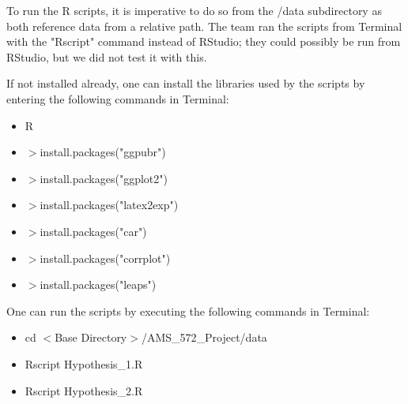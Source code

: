 To run the R scripts, it is imperative to do so from the /data subdirectory as both reference data from a relative path. The team ran the scripts from Terminal with the "Rscript" command instead of RStudio; they could possibly be run from RStudio, but we did not test it with this. 

If not installed already, one can install the libraries used by the scripts by entering the following commands in Terminal:

\begin{itemize}
	\item R
	\item $>$install.packages("ggpubr")
	\item $>$install.packages("ggplot2")
	\item $>$install.packages("latex2exp")
	\item $>$install.packages("car")
	\item $>$install.packages("corrplot")
	\item $>$install.packages("leaps")
\end{itemize}

One can run the scripts by executing the following commands in Terminal:

\begin{itemize}
	\item cd $<$Base Directory$>$/AMS\_572\_Project/data
	\item Rscript Hypothesis\_1.R
	\item Rscript Hypothesis\_2.R
\end{itemize}